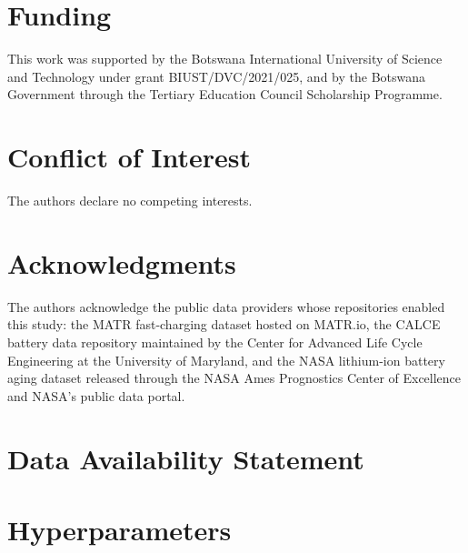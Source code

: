 \documentclass[%
 aip,
 amsmath,amssymb,
reprint, onecolumn %
]{revtex4-1}
\begin{document}
\section*{Funding}
This work was supported by the Botswana International University of Science and Technology under grant BIUST/DVC/2021/025, and by the Botswana Government through the Tertiary Education Council Scholarship Programme.

\section*{Conflict of Interest}
The authors declare no competing interests.

\section*{Acknowledgments}
The authors acknowledge the public data providers whose repositories enabled this study: the MATR fast-charging dataset hosted on MATR.io, the CALCE battery data repository maintained by the Center for Advanced Life Cycle Engineering at the University of Maryland, and the NASA lithium-ion battery aging dataset released through the NASA Ames Prognostics Center of Excellence and NASA's public data portal.


\section*{Data Availability Statement}


\appendix
\section{Hyperparameters}
\label{app:hyperparams}
\end{document}
